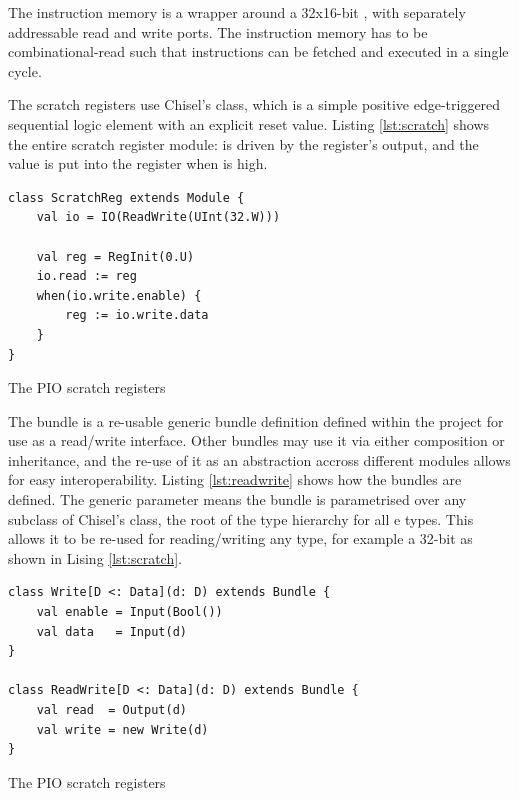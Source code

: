 The instruction memory is a wrapper around a 32x16-bit , with separately addressable read and write ports. The instruction memory has to be combinational-read such that instructions can be fetched and executed in a single cycle.

The scratch registers use Chisel's  class, which is a simple positive edge-triggered sequential logic element with an explicit reset value. Listing \ref{lst:scratch} shows the entire scratch register module:  is driven by the register's output, and the  value is put into the register when  is high.

\begin{listing}[h!]
    \vspace{0.5cm}
    \begin{verbatim}
class ScratchReg extends Module {
    val io = IO(ReadWrite(UInt(32.W)))
    
    val reg = RegInit(0.U)
    io.read := reg
    when(io.write.enable) {
        reg := io.write.data
    }
}
    \end{verbatim}
    \caption{The PIO scratch registers}
    \label{lst:scratch}
\end{listing}

The  bundle is a re-usable generic bundle definition defined within the project for use as a read/write interface. Other bundles may use it via either composition or inheritance, and the re-use of it as an abstraction accross different modules allows for easy interoperability. Listing \ref{lst:readwrite} shows how the bundles are defined. The generic parameter  means the bundle is parametrised over any subclass of Chisel's  class, the root of the type hierarchy for all e types. This allows it to be re-used for reading/writing any type, for example a 32-bit  as shown in Lising \ref{lst:scratch}.

\begin{listing}[h!]
    \vspace{0.5cm}
    \begin{verbatim}
class Write[D <: Data](d: D) extends Bundle {
    val enable = Input(Bool())
    val data   = Input(d)
}

class ReadWrite[D <: Data](d: D) extends Bundle {
    val read  = Output(d)
    val write = new Write(d)
}
    \end{verbatim}
    \caption{The PIO scratch registers}
    \label{lst:readwrite}
\end{listing}

